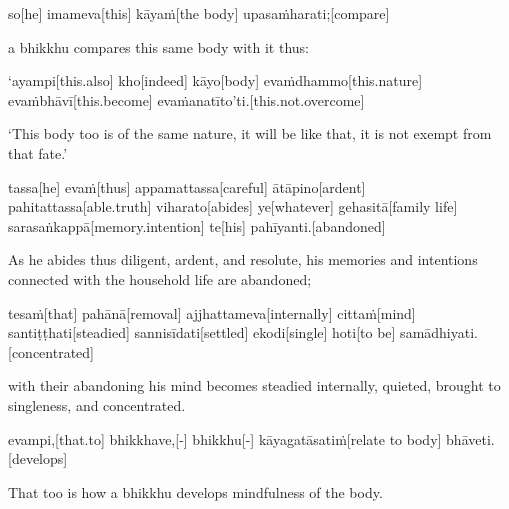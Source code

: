 \begin{samepage}
\begingl[glneveryline={\PaliGlossA,\PaliGlossB}]
so[he] imameva[this] kāyaṁ[the body] upasaṁharati;[compare]
\endgl
\nopagebreak
\linespread{0.5}
\begin{spacin}{0.2}
{\PaliGlossFT a bhikkhu compares this same body with it thus:}
\end{spacin}
\vskip 12pt
\end{samepage}
\begin{samepage}
\begingl[glneveryline={\PaliGlossA,\PaliGlossB}]
‘ayampi[this.also] kho[indeed] kāyo[body] evaṁdhammo[this.nature] evaṁbhāvī[this.become] evaṁanatīto’ti.[this.not.overcome]
\endgl
\nopagebreak
\linespread{0.5}
\begin{spacin}{0.2}
{\PaliGlossFT ‘This body too is of the same nature, it will be like that, it is not exempt from that fate.’}
\end{spacin}
\vskip 12pt
\end{samepage}
\begin{samepage}
\begingl[glneveryline={\PaliGlossA,\PaliGlossB}]
tassa[he] evaṁ[thus] appamattassa[careful] ātāpino[ardent] pahitattassa[able.truth] viharato[abides] ye[whatever] gehasitā[family life] sarasaṅkappā[memory.intention] te[his] pahīyanti.[abandoned]
\endgl
\nopagebreak
\linespread{0.5}
\begin{spacin}{0.2}
{\PaliGlossFT As he abides thus diligent, ardent, and resolute, his memories and intentions connected with the household life are abandoned;}
\end{spacin}
\vskip 12pt
\end{samepage}
\begin{samepage}
\begingl[glneveryline={\PaliGlossA,\PaliGlossB}]
tesaṁ[that] pahānā[removal] ajjhattameva[internally] cittaṁ[mind] santiṭṭhati[steadied] sannisīdati[settled] ekodi[single] hoti[to be] samādhiyati.[concentrated]
\endgl
\nopagebreak
\linespread{0.5}
\begin{spacin}{0.2}
{\PaliGlossFT with their abandoning his mind becomes steadied internally, quieted, brought to singleness, and concentrated.}
\end{spacin}
\vskip 12pt
\end{samepage}
\begin{samepage}
\begingl[glneveryline={\PaliGlossA,\PaliGlossB}]
evampi,[that.to] bhikkhave,[-] bhikkhu[-] kāyagatāsatiṁ[relate to body] bhāveti.[develops]
\endgl
\nopagebreak
\linespread{0.5}
\begin{spacin}{0.2}
{\PaliGlossFT That too is how a bhikkhu develops mindfulness of the body.}
\end{spacin}
\vskip 12pt
\end{samepage}

